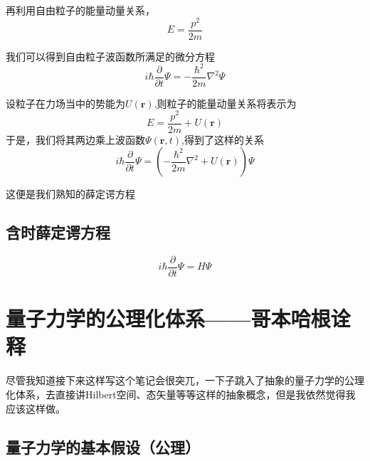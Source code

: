 \documentclass{article}
\newcommand{\Da}[2]{\frac{\partial}{\partial#2}#1}
\begin{document}
再利用自由粒子的能量动量关系，
\[E=\frac{p^2}{2m}\]

我们可以得到自由粒子波函数所满足的微分方程
\begin{equation}
    i\hbar\Da{\Psi}{t}=-\frac{\hbar^2}{2m}\nabla^2\Psi
\end{equation}

设粒子在力场当中的势能为$U(\textbf{r})$,则粒子的能量动量关系将表示为
\[
    E=\frac{p^2}{2m}+U(\textbf{r})
\]
于是，我们将其两边乘上波函数$\Psi(\textbf{r},t)$,得到了这样的关系
\begin{equation}
    i\hbar\Da{\Psi}{t}=(-\frac{\hbar^2}{2m}\nabla^2+U(\textbf{r}))\Psi
\end{equation}

这便是我们熟知的薛定谔方程

\subsection{含时薛定谔方程}
\begin{equation}
    i\hbar\Da{\Psi}{t}=H\Psi
\end{equation}



\section{量子力学的公理化体系——哥本哈根诠释}
尽管我知道接下来这样写这个笔记会很突兀，一下子跳入了抽象的量子力学的公理化体系，去直接讲Hilbert空间、态矢量等等这样的抽象概念，但是我依然觉得我应该这样做。

\subsection{量子力学的基本假设（公理）}
\end{document}
